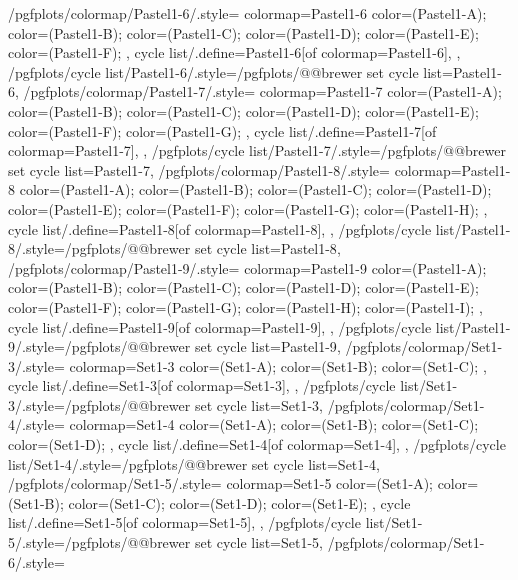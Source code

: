 {  /pgfplots/colormap/Pastel1-6/.style={
    colormap={Pastel1-6}{
      color=(Pastel1-A);
      color=(Pastel1-B);
      color=(Pastel1-C);
      color=(Pastel1-D);
      color=(Pastel1-E);
      color=(Pastel1-F);
    },
    cycle list/.define={Pastel1-6}{[of colormap=Pastel1-6]},
  },
  /pgfplots/cycle list/Pastel1-6/.style={/pgfplots/@@brewer set cycle list={Pastel1-6}},
  /pgfplots/colormap/Pastel1-7/.style={
    colormap={Pastel1-7}{
      color=(Pastel1-A);
      color=(Pastel1-B);
      color=(Pastel1-C);
      color=(Pastel1-D);
      color=(Pastel1-E);
      color=(Pastel1-F);
      color=(Pastel1-G);
    },
    cycle list/.define={Pastel1-7}{[of colormap=Pastel1-7]},
  },
  /pgfplots/cycle list/Pastel1-7/.style={/pgfplots/@@brewer set cycle list={Pastel1-7}},
  /pgfplots/colormap/Pastel1-8/.style={
    colormap={Pastel1-8}{
      color=(Pastel1-A);
      color=(Pastel1-B);
      color=(Pastel1-C);
      color=(Pastel1-D);
      color=(Pastel1-E);
      color=(Pastel1-F);
      color=(Pastel1-G);
      color=(Pastel1-H);
    },
    cycle list/.define={Pastel1-8}{[of colormap=Pastel1-8]},
  },
  /pgfplots/cycle list/Pastel1-8/.style={/pgfplots/@@brewer set cycle list={Pastel1-8}},
  /pgfplots/colormap/Pastel1-9/.style={
    colormap={Pastel1-9}{
      color=(Pastel1-A);
      color=(Pastel1-B);
      color=(Pastel1-C);
      color=(Pastel1-D);
      color=(Pastel1-E);
      color=(Pastel1-F);
      color=(Pastel1-G);
      color=(Pastel1-H);
      color=(Pastel1-I);
    },
    cycle list/.define={Pastel1-9}{[of colormap=Pastel1-9]},
  },
  /pgfplots/cycle list/Pastel1-9/.style={/pgfplots/@@brewer set cycle list={Pastel1-9}},
  /pgfplots/colormap/Set1-3/.style={
    colormap={Set1-3}{
      color=(Set1-A);
      color=(Set1-B);
      color=(Set1-C);
    },
    cycle list/.define={Set1-3}{[of colormap=Set1-3]},
  },
  /pgfplots/cycle list/Set1-3/.style={/pgfplots/@@brewer set cycle list={Set1-3}},
  /pgfplots/colormap/Set1-4/.style={
    colormap={Set1-4}{
      color=(Set1-A);
      color=(Set1-B);
      color=(Set1-C);
      color=(Set1-D);
    },
    cycle list/.define={Set1-4}{[of colormap=Set1-4]},
  },
  /pgfplots/cycle list/Set1-4/.style={/pgfplots/@@brewer set cycle list={Set1-4}},
  /pgfplots/colormap/Set1-5/.style={
    colormap={Set1-5}{
      color=(Set1-A);
      color=(Set1-B);
      color=(Set1-C);
      color=(Set1-D);
      color=(Set1-E);
    },
    cycle list/.define={Set1-5}{[of colormap=Set1-5]},
  },
  /pgfplots/cycle list/Set1-5/.style={/pgfplots/@@brewer set cycle list={Set1-5}},
  /pgfplots/colormap/Set1-6/.style={
}}
